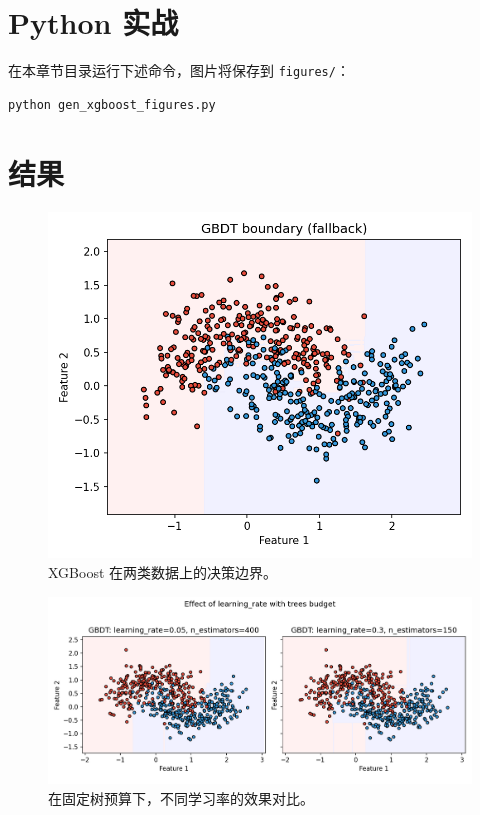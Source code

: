 \documentclass[UTF8,zihao=-4]{ctexart}
\begin{document}
\section{Python 实战}
在本章节目录运行下述命令，图片将保存到 \texttt{figures/}：
\begin{lstlisting}[style=code,caption={生成 XGBoost 配图},label={lst:genfigs_xgb_cn}]
python gen_xgboost_figures.py
\end{lstlisting}



\section{结果}
\begin{figure}[H]
  \centering
  \includegraphics[width=0.9\linewidth]{xgb_decision_boundary_2class.png}
  \caption{XGBoost 在两类数据上的决策边界。}
  \label{fig:xgb2_cn}
\end{figure}
\FloatBarrier

\begin{figure}[H]
  \centering
  \includegraphics[width=0.95\linewidth]{xgb_learning_rate_compare.png}
  \caption{在固定树预算下，不同学习率的效果对比。}
  \label{fig:xgb_lr_cn}
\end{figure}
\FloatBarrier
\end{document}
